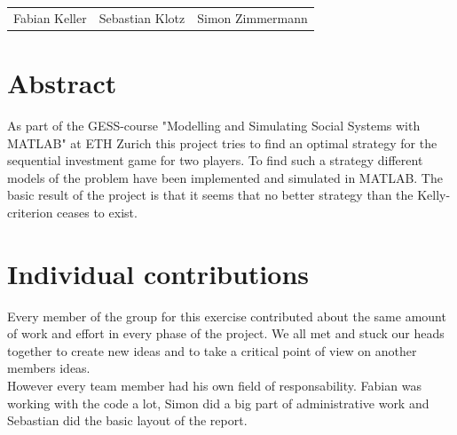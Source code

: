 \documentclass[11pt]{article}
\begin{document}

\begin{center}
\bigskip
\bigskip
\setlength{\tabcolsep}{15pt}
	\begin{tabular}{l c r}	
		Fabian Keller  &  Sebastian Klotz  &  Simon Zimmermann
	\end{tabular}
\end{center}
\newpage


\tableofcontents
\newpage


\section{Abstract}
As part of the GESS-course "Modelling and Simulating Social Systems with MATLAB" at ETH Zurich this project tries to find an optimal strategy for the sequential investment game for two players. To find such a strategy different models of the problem have been implemented and simulated in MATLAB. The basic result of the project is that it seems that no better strategy than the Kelly-criterion ceases to exist. 

\section{Individual contributions}
Every member of the group for this exercise contributed about the same amount of work and effort in every phase of the project. We all met and stuck our heads together to create new ideas and to take a critical point of view on another members ideas. \\
However every team member had his own field of responsability. Fabian was working with the code a lot, Simon did a big part of administrative work and Sebastian did the basic layout of the report.
\end{document}
